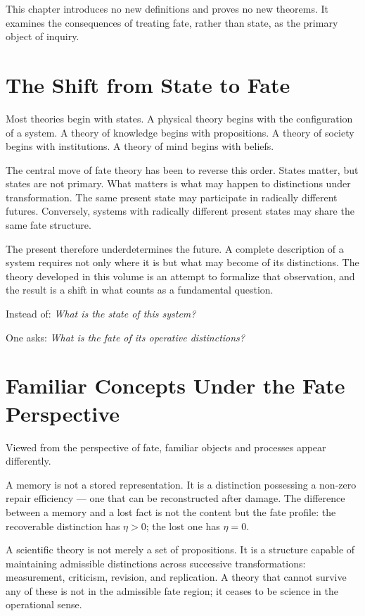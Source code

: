 \documentclass[12pt,twoside,openright]{book}
\newcommand{\repEff}{\eta}               %
\begin{document}
This chapter introduces no new definitions and proves no new
theorems. It examines the consequences of treating fate, rather
than state, as the primary object of inquiry.

\section{The Shift from State to Fate}

Most theories begin with states. A physical theory begins with
the configuration of a system. A theory of knowledge begins
with propositions. A theory of society begins with institutions.
A theory of mind begins with beliefs.

The central move of fate theory has been to reverse this order.
States matter, but states are not primary. What matters is what
may happen to distinctions under transformation. The same
present state may participate in radically different futures.
Conversely, systems with radically different present states may
share the same fate structure.

The present therefore underdetermines the future. A complete
description of a system requires not only where it is but what
may become of its distinctions. The theory developed in this
volume is an attempt to formalize that observation, and the
result is a shift in what counts as a fundamental question.

Instead of: \textit{What is the state of this system?}

One asks: \textit{What is the fate of its operative distinctions?}

\section{Familiar Concepts Under the Fate Perspective}

Viewed from the perspective of fate, familiar objects and
processes appear differently.

A memory is not a stored representation. It is a distinction
possessing a non-zero repair efficiency --- one that can be
reconstructed after damage. The difference between a memory and
a lost fact is not the content but the fate profile: the
recoverable distinction has $\repEff>0$; the lost one has
$\repEff=0$.

A scientific theory is not merely a set of propositions. It is
a structure capable of maintaining admissible distinctions
across successive transformations: measurement, criticism,
revision, and replication. A theory that cannot survive any of
these is not in the admissible fate region; it ceases to be
science in the operational sense.
\end{document}
